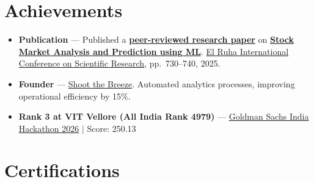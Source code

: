 \documentclass[a4paper,10pt]{article}
\newcommand{\ulink}[2]{\href{#1}{#2}}
\begin{document}
\section{Achievements}
\vspace{2pt}

\begin{itemize}[nosep, leftmargin=1.5em, itemsep=2pt, topsep=2pt]
  \item {\color[HTML]{0A0A0A}\fontsize{11}{14}\selectfont \textbf{Publication} --- Published a \ulink{https://www.elruha.org/_files/ugd/614b1f_6b95e1b697bf452b9907ba46e0151c05.pdf\#page=774}{\textbf{peer-reviewed research paper}} on \ulink{https://github.com/su-jin1425/Set-Project}{\textbf{Stock Market Analysis and Prediction using ML}}. \ulink{https://www.elruha.org/congress-books}{El Ruha International Conference on Scientific Research}, pp.\ 730--740, 2025.}
  \item {\color[HTML]{0A0A0A}\fontsize{11}{14}\selectfont \textbf{Founder} --- \ulink{https://shoot-the-breeze.vercel.app}{Shoot the Breeze}. Automated analytics processes, improving operational efficiency by 15\%.}
  \item {\color[HTML]{0A0A0A}\fontsize{11}{14}\selectfont \textbf{Rank 3 at VIT Vellore (All India Rank 4979)} --- \ulink{https://www.hackerrank.com/contests/goldman-sachs-india-hackathon-2026-cs/leaderboard}{Goldman Sachs India Hackathon 2026} $|$ Score: 250.13}
\end{itemize}

\section{Certifications}
\vspace{2pt}
\end{document}
